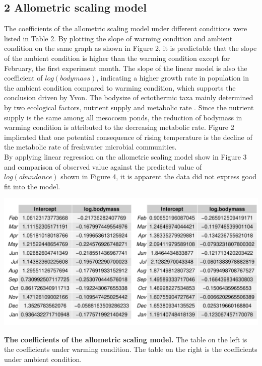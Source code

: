 \documentclass[11pt]{article}
\begin{document}
\begin{linenumbers}
\section*{2 Allometric scaling model}
The coefficients of the allometric scaling model under different conditions were listed in Table 2.
By plotting the slope of warming condition and ambient condition on the same graph as shown in Figure 2, it is predictable that the slope of the ambient condition is higher than the warming condition except for February, the first experiment month.
The slope of the linear model is also the coefficient of $log(bodymass)$, indicating a higher growth rate in population in the ambient condition compared to warming condition, which supports the conclusion driven by Yvon.
The bodysize of ectothermic taxa mainly determined by two ecological factors, nutrient supply and metabolic rate \cite{sheridan2011shrinking}. Since the nutrient supply is the same among all mesocosm ponds, the reduction of bodymass in warming condition is attributed to the decreasing metabolic rate. Figure 2 implicated that one potential consequence of rising temperature is the decline of the metabolic rate of freshwater microbial communities.  \\
By applying linear regression on the allometric scaling model show in Figure 3 and comparison of observed value against the predicted value of $log(abundance)$ shown in Figure 4, it is apparent the data did not express good fit into the model.

\begin{table}[H]
  \centering
  \includegraphics[scale = 0.8]{../Graph/ascoef.pdf}
  \caption{\textbf{The coefficients of the allometric scaling model.}  The table on the left is the coefficients under warming condition. The table on the right is the coefficients under ambient condition. }
\end{table}


\end{linenumbers}
\end{document}
